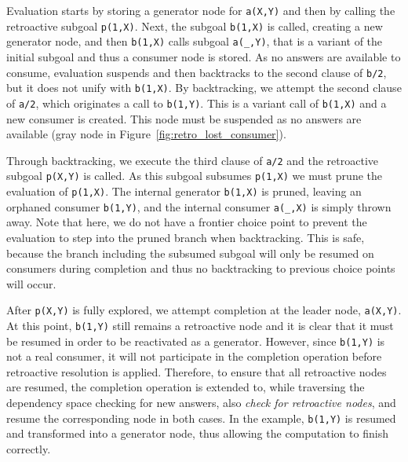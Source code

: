 Evaluation starts by storing a generator node for \texttt{a(X,Y)} and then by calling
the retroactive subgoal \texttt{p(1,X)}. Next, the subgoal \texttt{b(1,X)} is called, creating a new
generator node, and then \texttt{b(1,X)} calls subgoal \texttt{a(\_,Y)}, that is a variant of the
initial subgoal and thus a consumer node is stored. As no answers are available to consume,
evaluation suspends and then backtracks to the second clause of \texttt{b/2}, but it does not
unify with \texttt{b(1,X)}. By backtracking, we attempt the second clause of \texttt{a/2}, which
originates a call to \texttt{b(1,Y)}. This is a variant call of \texttt{b(1,X)} and a new consumer is
created. This node must be suspended as no answers are available (gray node in Figure~\ref{fig:retro_lost_consumer}).

Through backtracking, we execute the third clause of \texttt{a/2} and the retroactive subgoal \texttt{p(X,Y)}
is called. As this subgoal subsumes \texttt{p(1,X)} we must prune the evaluation of \texttt{p(1,X)}.
The internal generator \texttt{b(1,X)} is pruned, leaving an orphaned consumer \texttt{b(1,Y)}, and the internal
consumer \texttt{a(\_,X)} is simply thrown away. Note that here, we do not have a frontier choice point
to prevent the evaluation to step into the pruned branch when backtracking. This is safe, because
the branch including the subsumed subgoal will only be resumed on consumers during completion and thus
no backtracking to previous choice points will occur.

After \texttt{p(X,Y)} is fully explored, we attempt completion at the leader node,
\texttt{a(X,Y)}. At this point, \texttt{b(1,Y)} still remains
a retroactive node and it is clear that it must be resumed in order to be reactivated as a generator.
However, since \texttt{b(1,Y)} is not a real consumer, it will not participate
in the completion operation before retroactive resolution is applied. Therefore, to ensure that all
retroactive nodes are resumed, the completion operation is extended to, while traversing the dependency space
checking for new answers, also \textit{check for retroactive nodes}, and resume the corresponding
node in both cases. In the example, \texttt{b(1,Y)} is resumed and transformed into a
generator node, thus allowing the computation to finish correctly.

